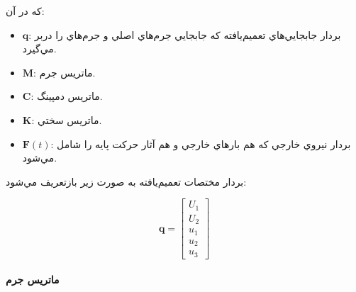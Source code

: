 كه در آن:

\begin{itemize}
    \item $\mathbf{q}$: بردار جابجايي‌هاي تعميم‌يافته كه جابجايي جرم‌هاي اصلي و جرم‌هاي  را دربر مي‌گيرد.
    \item $\mathbf{M}$: ماتريس جرم.
    \item $\mathbf{C}$: ماتريس دمپينگ.
    \item $\mathbf{K}$: ماتريس سختي.
    \item $\mathbf{F}(t)$: بردار نيروي خارجي كه هم بارهاي خارجي و هم آثار حركت پايه را شامل مي‌شود.
\end{itemize}

بردار مختصات تعميم‌يافته به صورت زير بازتعريف مي‌شود:

\begin{equation}\label{Eq.generalized_coordinate_combined}
    \mathbf{q} = 
  \begin{bmatrix}
    U_1 \\ U_2 \\ u_1 \\ u_2 \\ u_3
  \end{bmatrix}
\end{equation}

\paragraph{ماتريس جرم}

